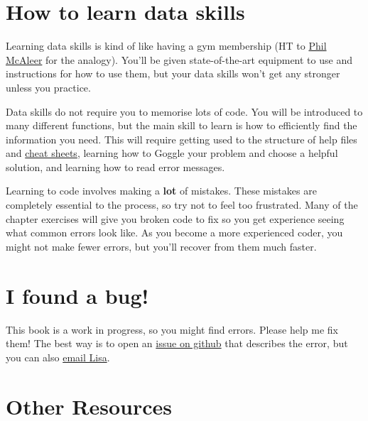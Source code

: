 \documentclass[
  oneside]{book}
\begin{document}
\hypertarget{how-to-learn-data-skills}{%
\section*{How to learn data skills}\label{how-to-learn-data-skills}}

Learning data skills is kind of like having a gym membership (HT to \href{https://twitter.com/McAleerP}{Phil McAleer} for the analogy). You'll be given state-of-the-art equipment to use and instructions for how to use them, but your data skills won't get any stronger unless you practice.

Data skills do not require you to memorise lots of code. You will be introduced to many different functions, but the main skill to learn is how to efficiently find the information you need. This will require getting used to the structure of help files and \href{https://www.rstudio.com/resources/cheatsheets/}{cheat sheets}, learning how to Goggle your problem and choose a helpful solution, and learning how to read error messages.

Learning to code involves making a \textbf{lot} of mistakes. These mistakes are completely essential to the process, so try not to feel too frustrated. Many of the chapter exercises will give you broken code to fix so you get experience seeing what common errors look like. As you become a more experienced coder, you might not make fewer errors, but you'll recover from them much faster.

\hypertarget{i-found-a-bug}{%
\section*{I found a bug!}\label{i-found-a-bug}}

This book is a work in progress, so you might find errors. Please help me fix them! The best way is to open an \href{https://github.com/PsyTeachR/reprores-v2/issues}{issue on github} that describes the error, but you can also \href{mailto:lisa.debruine@glasgow.ac.uk?subject=reprores}{email Lisa}.

\hypertarget{other-resources}{%
\section*{Other Resources}\label{other-resources}}
\end{document}
